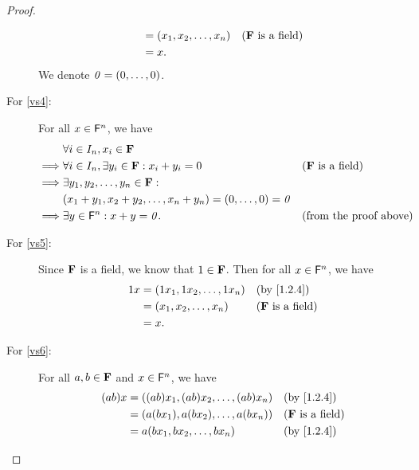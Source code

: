 \begin{proof}
\begin{description}
\begin{align*}
                                    & = {\left\lparen{x}_{1}, {x}_{2}, \dots, {x}_{n}\right\rparen}                                  &  & \text{(\(\mathbf{F}\) is a field)} \\
                                    & = x.
            \end{align*}
            We denote \(\mathit{0} = \left\lparen0, \dots, 0\right\rparen\).
        \item[For \ref{vs4}:]
            For all \(x \in \mathsf{F}^{n}\), we have
            \begin{align*}
                         & \forall i \in I_{n}, x_{i} \in \F                                                                                 \\
                \implies & \forall i \in I_{n}, \exists y_{i} \in \F : x_{i} + y_{i} = 0                  &  & \text{(\(\F\) is a field)}    \\
                \implies & \exists y_{1}, y_{2}, \dots, y_{n} \in \F :                                                                       \\
                         & \p{x_{1} + y_{1}, x_{2} + y_{2}, \dots, x_{n} + y_{n}} = \p{0, \dots, 0} = \zv                                    \\
                \implies & \exists y \in \vs{F}^{n} : x + y = \zv.                                        &  & \text{(from the proof above)}
            \end{align*}
        \item[For \ref{vs5}:]
            Since \(\mathbf{F}\) is a field, we know that \(1 \in \mathbf{F}\).
            Then for all \(x \in \mathsf{F}^{n}\), we have
            \begin{align*}
                1x & = \p{1 x_{1}, 1 x_{2}, \dots, 1 x_{n}} &  & \text{(by \cref{1.2.4})}   \\
                   & = \tp{x}{n}                            &  & \text{(\(\F\) is a field)} \\
                   & = x.
            \end{align*}
        \item[For \ref{vs6}:]
            For all \(a, b \in \mathbf{F}\) and \(x \in \mathsf{F}^{n}\), we have
            \begin{align*}
                \p{ab} x & = \p{\p{ab} x_{1}, \p{ab} x_{2}, \dots, \p{ab} x_{n}}    &  & \text{(by \cref{1.2.4})}   \\
                         & = \p{a \p{b x_{1}}, a \p{b x_{2}}, \dots, a \p{b x_{n}}} &  & \text{(\(\F\) is a field)} \\
                         & = a \p{b x_{1}, b x_{2}, \dots, b x_{n}}                 &  & \text{(by \cref{1.2.4})}   \\

\end{align*}
\end{description}
\end{proof}
